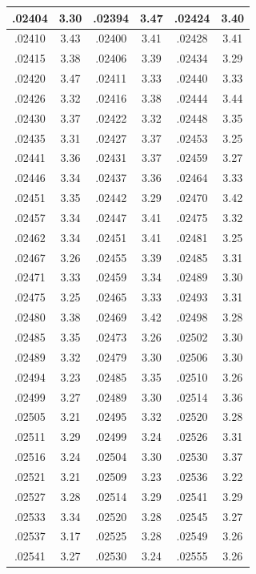 \documentclass[11pt]{report}
\begin{document}
\begin{appendices}
\begin{longtable}{|c|c||c|c||c|c|}
.02404 & 3.30 & .02394 & 3.47 & .02424 & 3.40\\\hline
.02410 & 3.43 & .02400 & 3.41 & .02428 & 3.41\\\hline
.02415 & 3.38 & .02406 & 3.39 & .02434 & 3.29\\\hline
.02420 & 3.47 & .02411 & 3.33 & .02440 & 3.33\\\hline
.02426 & 3.32 & .02416 & 3.38 & .02444 & 3.44\\\hline
.02430 & 3.37 & .02422 & 3.32 & .02448 & 3.35\\\hline
.02435 & 3.31 & .02427 & 3.37 & .02453 & 3.25\\\hline
.02441 & 3.36 & .02431 & 3.37 & .02459 & 3.27\\\hline
.02446 & 3.34 & .02437 & 3.36 & .02464 & 3.33\\\hline
.02451 & 3.35 & .02442 & 3.29 & .02470 & 3.42\\\hline
.02457 & 3.34 & .02447 & 3.41 & .02475 & 3.32\\\hline
.02462 & 3.34 & .02451 & 3.41 & .02481 & 3.25\\\hline
.02467 & 3.26 & .02455 & 3.39 & .02485 & 3.31\\\hline
.02471 & 3.33 & .02459 & 3.34 & .02489 & 3.30\\\hline
.02475 & 3.25 & .02465 & 3.33 & .02493 & 3.31\\\hline
.02480 & 3.38 & .02469 & 3.42 & .02498 & 3.28\\\hline
.02485 & 3.35 & .02473 & 3.26 & .02502 & 3.30\\\hline
.02489 & 3.32 & .02479 & 3.30 & .02506 & 3.30\\\hline
.02494 & 3.23 & .02485 & 3.35 & .02510 & 3.26\\\hline
.02499 & 3.27 & .02489 & 3.30 & .02514 & 3.36\\\hline
.02505 & 3.21 & .02495 & 3.32 & .02520 & 3.28\\\hline
.02511 & 3.29 & .02499 & 3.24 & .02526 & 3.31\\\hline
.02516 & 3.24 & .02504 & 3.30 & .02530 & 3.37\\\hline
.02521 & 3.21 & .02509 & 3.23 & .02536 & 3.22\\\hline
.02527 & 3.28 & .02514 & 3.29 & .02541 & 3.29\\\hline
.02533 & 3.34 & .02520 & 3.28 & .02545 & 3.27\\\hline
.02537 & 3.17 & .02525 & 3.28 & .02549 & 3.26\\\hline
.02541 & 3.27 & .02530 & 3.24 & .02555 & 3.26\\\hline

\end{longtable}
\end{appendices}
\end{document}
